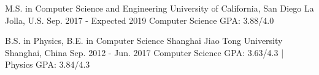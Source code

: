 


\begin{cventries}


\cventry
{M.S. in Computer Science and Engineering} %
{University of California, San Diego} %
{La Jolla, U.S.} %
{Sep. 2017 - Expected 2019} %
{Computer Science GPA: 3.88/4.0}


\cventry
{B.S. in Physics, B.E. in Computer Science} %
{Shanghai Jiao Tong University} %
{Shanghai, China} %
{Sep. 2012 - Jun. 2017} %
{Computer Science GPA: 3.63/4.3 \hspace{.1cm} | \hspace{.1cm} Physics GPA: 3.84/4.3}


\end{cventries}
